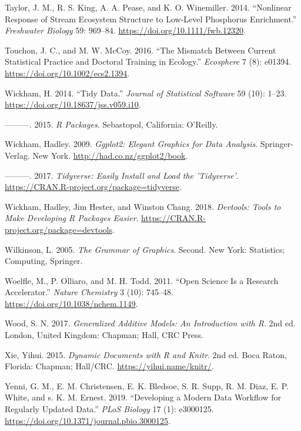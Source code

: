 \documentclass[fleqn,10pt,lineno]{wlpeerj} %
\begin{document}
\leavevmode\hypertarget{ref-Taylor14}{}%
Taylor, J. M., R. S. King, A. A. Pease, and K. O. Winemiller. 2014. ``Nonlinear Response of Stream Ecosystem Structure to Low-Level Phosphorus Enrichment.'' \emph{Freshwater Biology} 59: 969--84. \url{https://doi.org/10.1111/fwb.12320}.

\leavevmode\hypertarget{ref-Touchon16}{}%
Touchon, J. C., and M. W. McCoy. 2016. ``The Mismatch Between Current Statistical Practice and Doctoral Training in Ecology.'' \emph{Ecosphere} 7 (8): e01394. \url{https://doi.org/10.1002/ecs2.1394}.

\leavevmode\hypertarget{ref-Wickham14c}{}%
Wickham, H. 2014. ``Tidy Data.'' \emph{Journal of Statistical Software} 59 (10): 1--23. \url{https://doi.org/10.18637/jss.v059.i10}.

\leavevmode\hypertarget{ref-Wickham15}{}%
---------. 2015. \emph{R Packages}. Sebastopol, California: O'Reilly.

\leavevmode\hypertarget{ref-Wickham09}{}%
Wickham, Hadley. 2009. \emph{Ggplot2: Elegant Graphics for Data Analysis}. Springer-Verlag. New York. \url{http://had.co.nz/ggplot2/book}.

\leavevmode\hypertarget{ref-Wickham17b}{}%
---------. 2017. \emph{Tidyverse: Easily Install and Load the 'Tidyverse'}. \url{https://CRAN.R-project.org/package=tidyverse}.

\leavevmode\hypertarget{ref-Wickham18}{}%
Wickham, Hadley, Jim Hester, and Winston Chang. 2018. \emph{Devtools: Tools to Make Developing R Packages Easier}. \url{https://CRAN.R-project.org/package=devtools}.

\leavevmode\hypertarget{ref-Wilkinson05}{}%
Wilkinson, L. 2005. \emph{The Grammar of Graphics}. Second. New York: Statistics; Computing, Springer.

\leavevmode\hypertarget{ref-Woelfle11}{}%
Woelfle, M., P. Olliaro, and M. H. Todd. 2011. ``Open Science Is a Research Accelerator.'' \emph{Nature Chemistry} 3 (10): 745--48. \url{https://doi.org/10.1038/nchem.1149}.

\leavevmode\hypertarget{ref-Wood17}{}%
Wood, S. N. 2017. \emph{Generalized Additive Models: An Introduction with R}. 2nd ed. London, United Kingdom: Chapman; Hall, CRC Press.

\leavevmode\hypertarget{ref-Xie15}{}%
Xie, Yihui. 2015. \emph{Dynamic Documents with R and Knitr}. 2nd ed. Boca Raton, Florida: Chapman; Hall/CRC. \url{https://yihui.name/knitr/}.

\leavevmode\hypertarget{ref-Yenni19}{}%
Yenni, G. M., E. M. Christensen, E. K. Bledsoe, S. R. Supp, R. M. Diaz, E. P. White, and s. K. M. Ernest. 2019. ``Developing a Modern Data Workflow for Regularly Updated Data.'' \emph{PLoS Biology} 17 (1): e3000125. \url{https://doi.org/10.1371/journal.pbio.3000125}.
\end{document}
